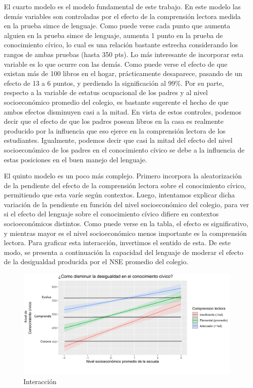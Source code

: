 \documentclass[12pt,twoside]{templates/facsothesis}
\begin{document}
El cuarto modelo es el modelo fundamental de este trabajo. En este modelo las demás variables son controladas por el efecto de la comprensión lectora medida en la prueba simce de lenguaje. Como puede verse cada punto que aumenta alguien en la prueba simce de lenguaje, aumenta 1 punto en la prueba de conocimiento cívico, lo cual es una relación bastante estrecha considerando los rangos de ambas pruebas (hasta 350 pts). Lo más interesante de incorporar esta variable es lo que ocurre con las demás. Como puede verse el efecto de que existan más de 100 libros en el hogar, prácticamente desaparece, pasando de un efecto de 13 a 6 puntos, y perdiendo la significación al 99\%. Por su parte, respecto a la variable de estatus ocupacional de los padres y al nivel socioeconómico promedio del colegio, es bastante sugerente el hecho de que ambos efectos disminuyen casi a la mitad. En vista de estos controles, podemos decir que el efecto de que los padres posean libros en la casa es realmente producido por la influencia que eso ejerce en la comprensión lectora de los estudiantes. Igualmente, podemos decir que casi la mitad del efecto del nivel socioeconómico de los padres en el conocimiento cívico se debe a la influencia de estas posiciones en el buen manejo del lenguaje.

El quinto modelo es un poco más complejo. Primero incorpora la aleatorización de la pendiente del efecto de la comprensión lectora sobre el conocimiento cívico, permitiendo que esta varíe según contextos. Luego, intentamos explicar dicha variación de la pendiente en función del nivel socioeconómico del colegio, para ver si el efecto del lenguaje sobre el conocimiento cívico difiere en contextos socioeconómicos distintos. Como puede verse en la tabla, el efecto es significativo, y mientras mayor es el nivel socioeconómico menos importante es la comprensión lectora. Para graficar esta interacción, invertimos el sentido de esta. De este modo, se presenta a continuación la capacidad del lenguaje de moderar el efecto de la desigualdad producida por el NSE promedio del colegio.

\begin{figure}[!ht]

{\centering \includegraphics[width=1.2\linewidth,]{images/inter2} 

}

\caption{Interacción}\label{fig:unnamed-chunk-14}
\end{figure}
\end{document}
